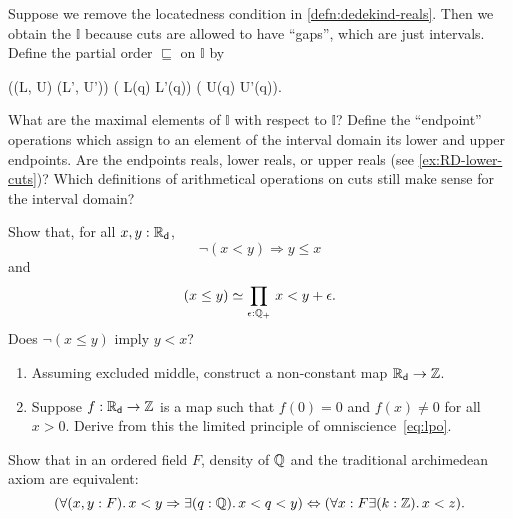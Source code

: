 \begin{ex} \label{ex:RD-interval-arithmetic}
  Suppose we remove the locatedness condition in \autoref{defn:dedekind-reals}.
  Then we obtain the 
  $\mathbb{I}$ because cuts are allowed
  to have ``gaps'', which are just intervals. Define the partial order $\sqsubseteq$ on
  $\mathbb{I}$ by
  \begin{narrowmultline*}
    ((L, U) \sqsubseteq (L', U'))
     \narrowbreak
    ( L(q) \Rightarrow L'(q)) \land
    ( U(q) \Rightarrow U'(q)).
  \end{narrowmultline*}
  What are the maximal elements of $\mathbb{I}$ with respect to $\mathbb{I}$? Define the
  ``endpoint'' operations which assign to an element of the interval domain its lower and
  upper endpoints. Are the endpoints reals, lower reals, or upper reals (see
  \autoref{ex:RD-lower-cuts})? Which definitions of arithmetical operations on cuts still
  make sense for the interval domain?
\end{ex}

\begin{ex} \label{ex:RD-lt-vs-le}
  Show that, for all $x, y : \mathbb{R}_\mathsf{d}$,
  \begin{equation*}
    \lnot (x < y) \Rightarrow y \leq x
  \end{equation*}
  and
  \begin{equation*}
    \eqv{(x \leq y)}{\prd{\epsilon : \Qp} x < y + \epsilon}.
  \end{equation*}
  Does $\lnot (x \leq y)$ imply $y < x$?
\end{ex}

\begin{ex} \label{ex:reals-non-constant-into-Z}
  \mbox{}
  \begin{enumerate}
  \item 
    Assuming excluded middle, construct a non-constant map $\mathbb{R}_\mathsf{d} \to \mathbb{Z}$.
  \item 
    Suppose $f : \mathbb{R}_\mathsf{d} \to \mathbb{Z}$ is a map such that $f(0) = 0$ and $f(x) \neq 0$ for all $x >
    0$. Derive from this the limited principle of omniscience~\eqref{eq:lpo}.
  \end{enumerate}
\end{ex}

\begin{ex} \label{ex:traditional-archimedean}
  Show that in an ordered field $F$, density of $\mathbb{Q}$ and the traditional archimedean axiom
  are equivalent:
  \begin{equation*}
    (\fall{x, y : F} x < y \Rightarrow \exis{q : \Q} x < q < y)
    \Leftrightarrow
    (\forall{x : F} \exis{k : \Z} x < z).
  \end{equation*}  
\end{ex}

